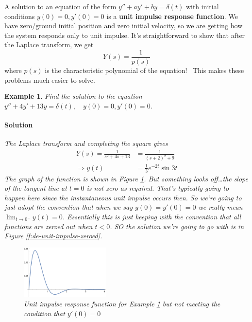 \documentclass[letterpaper, 11pt, openany]{book}
\theoremstyle{mytheoremstyle}
\theoremstyle{myexamplestyle}
\newtheorem{example}{Example}[section]
\newenvironment{solution}{\paragraph{\sffamily \smaller \fontseries{b}\selectfont Solution}}{\hfill\faSquare}
\begin{document}
A solution to an equation of the form \(y'' + ay' + by = \delta(t)\) with initial conditions \(y(0)=0, y'(0)=0\) is a \textbf{unit impulse response function}. We have zero/ground initial position and zero initial velocity, so we are getting how the system responds only to unit impulse. It's straightforward to show that after the Laplace transform, we get
\begin{equation}
    Y(s) = \frac{1}{p(s)}
\end{equation}
where \(p(s)\) is the characteristic polynomial of the equation! \faSmile \ This makes these problems much easier to solve.
\begin{example}\label{e:de-unit-impulse}
    Find the solution to the equation \(y'' + 4y' + 13y = \delta(t),\quad y(0)=0, y'(0)=0\).
    \begin{solution}
        The Laplace transform and completing the square gives
        \begin{align*}
            Y(s) = \frac{1}{s^2 + 4s + 13} &= \frac{1}{(s+2)^{2} + 9}\\
            \Rightarrow y(t) &= \frac{1}{3}e^{-2t}\sin 3t
        \end{align*}
        The graph of the function is shown in Figure \ref{f:de-unit-impulse}. But something looks off\dots the slope of the tangent line at \(t=0\) is not zero as required. That's typically going to happen here since the instantaneous unit impulse occurs then. So we're going to just adopt the convention that when we say \(y(0)=y'(0)=0\) we really mean \(\displaystyle \lim_{t\to 0^{-}} y(t) = 0\). Essentially this is just keeping with the convention that all functions are zeroed out when \(t<0\). SO the solution we're going to go with is in Figure \ref{f:de-unit-impulse-zeroed}.
        \begin{figure}[htbp]
            \centering
                \includegraphics[width=0.4\textwidth]{Figures/de-unit-impulse-response.pdf}
            \caption{Unit impulse response function for Example \ref{e:de-unit-impulse} but not meeting the condition that \(y'(0)=0\)}
            \label{f:de-unit-impulse}
        \end{figure}
        \begin{figure}[htbp]

\end{figure}
\end{solution}
\end{example}
\end{document}
